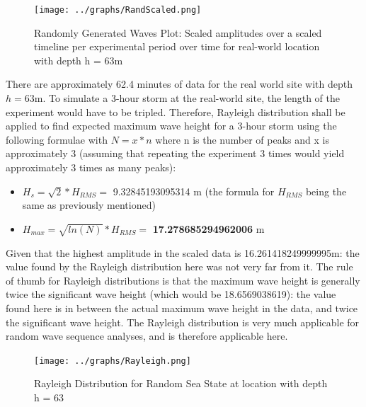 \documentclass{article}
\begin{document}
	\begin{figure}[H]
		\centering
		\texttt{[image: ../graphs/RandScaled.png]}
		\caption{Randomly Generated Waves Plot: Scaled amplitudes over a scaled timeline per experimental period over time for real-world location with depth h = 63m}
		\label{randscaled}
	\end{figure}
	There are approximately 62.4 minutes of data for the real world site with depth $h = 63$m. To simulate a 3-hour storm at the real-world site, the length of the experiment would have to be tripled. Therefore, Rayleigh distribution shall be applied to find expected maximum wave height for a 3-hour storm using the following formulae with $N = x*n$ where n is the number of peaks and x is approximately 3 (assuming that repeating the experiment 3 times would yield approximately 3 times as many peaks):\\
	\begin{itemize}
		\item $H_s = \sqrt{2} * H_{RMS} =$ 9.32845193095314 m (the formula for $H_{RMS}$ being the same as previously mentioned)
		\item $H_{max} = \sqrt{ln(N)} * H_{RMS} = $ \textbf{17.278685294962006} m
	\end{itemize}
	Given that the highest amplitude in the scaled data is 16.261418249999995m: the value found by the Rayleigh distribution here was not very far from it. The rule of thumb for Rayleigh distributions is that the maximum wave height is generally twice the significant wave height (which would be 18.6569038619): the value found here is in between the actual maximum wave height in the data, and twice the significant wave height. The Rayleigh distribution is very much applicable for random wave sequence analyses, and is therefore applicable here.
	\begin{figure}[H]
		\centering
		\texttt{[image: ../graphs/Rayleigh.png]}
		\caption{Rayleigh Distribution for Random Sea State at location with depth h = 63}
		\label{rayleigh}
	\end{figure}
\end{document}
